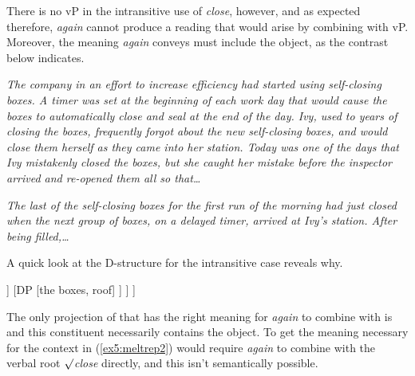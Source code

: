 There is no vP in the intransitive use of \emph{close}, however, and as expected therefore, \emph{again} cannot produce a reading that would arise by combining with vP. Moreover, the meaning \emph{again} conveys must include the object, as the contrast below indicates.
\pagebreak
\begin{exe}
	\sn \emph{The company in an effort to increase efficiency had started using self-closing boxes. A timer was set at the beginning of each work day that would cause the boxes to automatically close and seal at the end of the day. Ivy, used to years of closing the boxes, frequently forgot about the new self-closing boxes, and would close them herself as they came into her station. Today was one of the days that Ivy mistakenly closed the boxes, but she caught her mistake before the inspector arrived and re-opened them all so that\ldots}
	\raggedright
	\sn \emph{The last of the self-closing boxes for the first run of the morning had just closed when the next group of boxes, on a delayed timer, arrived at Ivy's station. After being filled,\ldots}
\end{exe}
A quick look at the D-structure for the intransitive case reveals why.
\begin{exe}
	\raggedright
	\ex \label{ex5:intmeltd} 
	\small
	\begin{forest}
	[VP [$\lambda \epsilon$ \textsc{close}($\epsilon$) $\wedge$ \textsc{patient}(the\_boxes)($\epsilon$)\\ \ibar{V}
		[$\lambda x \lambda \epsilon$ \textsc{close}($\epsilon$) $\wedge$ \textsc{patient}($x$)($\epsilon$)\\\obar{V} [$\surd$close] ]
		[DP [the boxes, roof] ]
	]
	]
	\end{forest}
\end{exe}
The only projection of  that has the right meaning for \emph{again} to combine with is  and this constituent necessarily contains the object. To get the meaning necessary for the context in (\ref{ex5:meltrep2}) would require \emph{again} to combine with the verbal root \emph{$\surd$close} directly, and this isn't semantically possible. 

